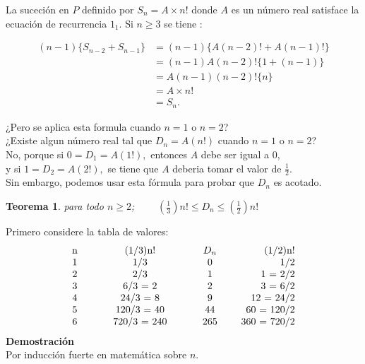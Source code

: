 \documentclass{article}
\newcommand{\ds}{\displaystyle}
\newtheorem{teo}{Teorema}{}
\begin{document}
La suceción en $P$ definido por $S_{n} = A \times n!$ donde $A$ es un número real satisface la ecuación de recurrencia $1_1$. Si $n \geq 3$ se tiene :

\begin{align*}
 (n-1)\{S_{n-2}+S_{n-1}\} &= (n-1)\{A(n-2)! + A(n-1)!\} \\
 						  &= (n-1)A(n-2)!\{1+(n-1)\} \\
 						  &= A(n-1)(n-2)!\{n\}\\
 						  &= A \times n!\\
 						  &= S_{n}.
\end{align*}

¿Pero se aplica esta formula cuando $n=1$ o $n=2$?\\
¿Existe algun número real tal que $D_{n} = A(n!)$ cuando $n=1$ o $n=2$?\\
No, porque si $0 = D_{1} =A(1!),$ entonces $A$ debe ser igual a $0$,\\
y si $1 = D_{2} = A(2!),$ se tiene que $A$ deberia tomar el valor de $\frac{1}{2}$.\\ \newline
Sin embargo, podemos usar esta fórmula para probar que $D_{n}$ es acotado.
\begin{teo}{}
para todo $n \geq 2$; $~~~~~~~~~\ds(\frac{1}{3})n! \leq D_{n} \leq (\frac{1}{2})n!$
\end{teo}
Primero considere la tabla de valores:\\

\begin{equation*}
\begin{tabular}{ c  c c c c c c c r }
   n &  &   &  (1/3)n!     &  & & $D_{n}$ & & (1/2)n! \\
   
   1 &  &   &  1/3         &  & & 0  & &  1/2\\
   
   2 &  &   &  2/3         &  & & 1  & &  1 = 2/2\\
   
   3 &  &   &  6/3 = 2     &  & & 2  & &  3 = 6/2\\
   
   4 &  &   &  24/3 = 8    &  & & 9  & &  12 = 24/2\\
   
   5 &  &   &  120/3 = 40  &  & & 44  & & 60 = 120/2\\
   6 &  &   &  720/3 = 240 &  & & 265 & & 360 = 720/2\\
\end{tabular}
\end{equation*}
\textbf{Demostración}\\
Por inducción fuerte en matemática sobre $n$.\\
\end{document}
